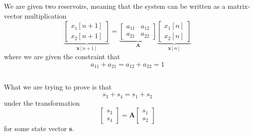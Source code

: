 \documentclass[]{article}
\numberwithin{equation}{section}
\begin{document}
\subsection{}

We are given two reservoirs, meaning that the system can be written as a matrix-vector multiplication
\begin{equation}
	\underbrace{\begin{bmatrix}
	x_1[n + 1] \\
	x_2[n + 1]
	\end{bmatrix}}_{\mathbf{x}[n + 1]}
	= 
	\underbrace{\begin{bmatrix}
	a_{11} & a_{12} \\
	a_{21} & a_{22}
	\end{bmatrix}}_{\mathbf{A}}
	\underbrace{\begin{bmatrix}
	x_1[n] \\
	x_2[n]
	\end{bmatrix}}_{\mathbf{x}[n]}
\end{equation}
where we are given the constraint that 
\begin{equation}
	a_{11} + a_{21} = a_{12} + a_{22} = 1
\end{equation}

\subsection{}

What we are trying to prove is that
\begin{equation}\label{eq:3-c}
	s_3 + s_4 = s_1 + s_2
\end{equation}
under the transformation
\begin{equation}
	\begin{bmatrix}
	s_3 \\
	s_4
	\end{bmatrix}
	=
	\mathbf{A} \begin{bmatrix}
	s_1 \\
	s_2
	\end{bmatrix}
\end{equation}
for some state vector \(\mathbf{s}\). 

\subsection{}
\end{document}
